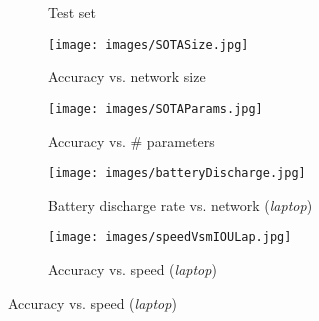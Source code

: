 \documentclass[runningheads]{llncs}
\begin{document}
\begin{figure}[t!]
\centering
\begin{subfigure}[b]{0.24\columnwidth}
\centering
{}
\caption{Test set}
\label{tab:compareSt}
\end{subfigure}
\hfill
\begin{subfigure}[b]{0.36\columnwidth}
\centering
\texttt{[image: images/SOTASize.jpg]}
\caption{Accuracy vs. network size}
\end{subfigure}
\hfill
\begin{subfigure}[b]{0.36\columnwidth}
\centering
\texttt{[image: images/SOTAParams.jpg]}
\caption{Accuracy vs. \# parameters}
\end{subfigure}
\vspace{2mm}
\begin{subfigure}[b]{0.48\columnwidth}
\centering
\texttt{[image: images/batteryDischarge.jpg]}
\caption{Battery discharge rate vs. network (\textit{laptop})}
\label{fig:batDis}
\end{subfigure}
\hfill
\begin{subfigure}[b]{0.48\columnwidth}
\centering
\texttt{[image: images/speedVsmIOULap.jpg]}
\caption{Accuracy vs. speed (\textit{laptop})}
\label{fig:overAccComp}

\end{subfigure}
\end{figure}
\end{document}

